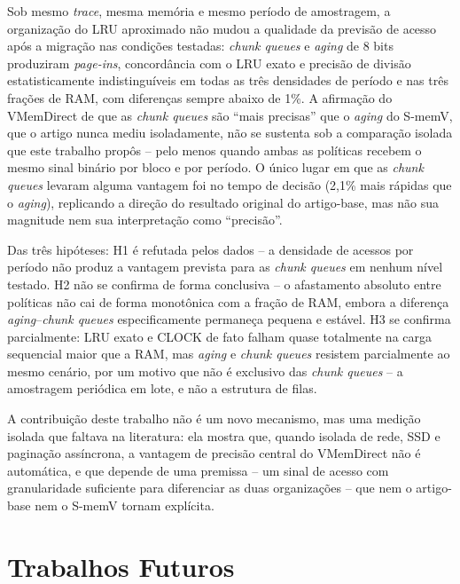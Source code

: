 \documentclass[12pt]{article}
\begin{document}
Sob mesmo \textit{trace}, mesma memória e mesmo período de amostragem, a organização do LRU aproximado não mudou a qualidade da previsão de acesso após a migração nas condições testadas: \textit{chunk queues} e \textit{aging} de 8 bits produziram \textit{page-ins}, concordância com o LRU exato e precisão de divisão estatisticamente indistinguíveis em todas as três densidades de período e nas três frações de RAM, com diferenças sempre abaixo de 1\%. A afirmação do VMemDirect de que as \textit{chunk queues} são ``mais precisas'' que o \textit{aging} do S-memV, que o artigo nunca mediu isoladamente, não se sustenta sob a comparação isolada que este trabalho propôs -- pelo menos quando ambas as políticas recebem o mesmo sinal binário por bloco e por período. O único lugar em que as \textit{chunk queues} levaram alguma vantagem foi no tempo de decisão (2,1\% mais rápidas que o \textit{aging}), replicando a direção do resultado original do artigo-base, mas não sua magnitude nem sua interpretação como ``precisão''.

Das três hipóteses: H1 é refutada pelos dados -- a densidade de acessos por período não produz a vantagem prevista para as \textit{chunk queues} em nenhum nível testado. H2 não se confirma de forma conclusiva -- o afastamento absoluto entre políticas não cai de forma monotônica com a fração de RAM, embora a diferença \textit{aging}--\textit{chunk queues} especificamente permaneça pequena e estável. H3 se confirma parcialmente: LRU exato e CLOCK de fato falham quase totalmente na carga sequencial maior que a RAM, mas \textit{aging} e \textit{chunk queues} resistem parcialmente ao mesmo cenário, por um motivo que não é exclusivo das \textit{chunk queues} -- a amostragem periódica em lote, e não a estrutura de filas.

A contribuição deste trabalho não é um novo mecanismo, mas uma medição isolada que faltava na literatura: ela mostra que, quando isolada de rede, SSD e paginação assíncrona, a vantagem de precisão central do VMemDirect não é automática, e que depende de uma premissa -- um sinal de acesso com granularidade suficiente para diferenciar as duas organizações -- que nem o artigo-base nem o S-memV tornam explícita.

\section{Trabalhos Futuros}
\end{document}
